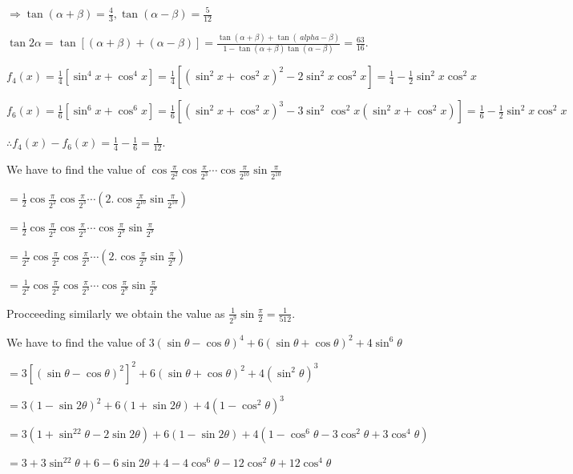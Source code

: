   $\Rightarrow \tan(\alpha + \beta) = \frac{4}{3}, \tan(\alpha - \beta) = \frac{5}{12}$

  $\tan2\alpha = \tan[(\alpha + \beta) + (\alpha - \beta)] = \frac{\tan(\alpha + \beta) + \tan(\
    alpha - \beta)}{1 - \tan(\alpha + \beta)\tan(\alpha - \beta)} = \frac{63}{16}$.
\item $f_4(x) = \frac{1}{4}\left[\sin^4x + \cos^4x\right] = \frac{1}{4}\left[\left(\sin^2x
  + \cos^2x\right)^2 - 2\sin^2x\cos^2x\right] = \frac{1}{4} - \frac{1}{2}\sin^2x\cos^2x$

  $f_6(x) = \frac{1}{6}\left[\sin^6x + \cos^6x\right] = \frac{1}{6}\left[\left(\sin^2x + \cos^2x\right)^3 -
  3\sin^2\cos^2x\left(\sin^2x + \cos^2x\right)\right] = \frac{1}{6} - \frac{1}{2}\sin^2x\cos^2x$

  $\therefore f_4(x) - f_6(x) = \frac{1}{4} - \frac{1}{6} = \frac{1}{12}$.
\item We have to find the value of
  $\cos\frac{\pi}{2^2}\cos\frac{\pi}{2^3}\cdots\cos\frac{\pi}{2^{10}}\sin\frac{\pi}{2^{10}}$

  $= \frac{1}{2}\cos\frac{\pi}{2^2}\cos\frac{\pi}{2^3}\cdots\left(2.\cos\frac{\pi}{2^{10}}\sin\frac{\pi}{2^{10}}\right)$

  $= \frac{1}{2}\cos\frac{\pi}{2^2}\cos\frac{\pi}{2^3}\cdots\cos\frac{\pi}{2^{9}}\sin\frac{\pi}{2^{9}}$

  $= \frac{1}{2^2}\cos\frac{\pi}{2^2}\cos\frac{\pi}{2^3}\cdots\left(2.\cos\frac{\pi}{2^{9}}\sin\frac{\pi}{2^{9}}\right)$

  $= \frac{1}{2^2}\cos\frac{\pi}{2^2}\cos\frac{\pi}{2^3}\cdots\cos\frac{\pi}{2^8}\sin\frac{\pi}{2^8}$

  Procceeding similarly we obtain the value as $\frac{1}{2^9}\sin\frac{\pi}{2} = \frac{1}{512}$.
\item We have to find the value of $3(\sin\theta - \cos\theta)^4 + 6(\sin\theta + \cos\theta)^2 +
  4\sin^6\theta$

  $= 3\left[\left(\sin\theta - \cos\theta\right)^2\right]^2 + 6(\sin\theta + \cos\theta)^2 +
  4\left(\sin^2\theta\right)^3$

  $= 3(1 - \sin2\theta)^2 + 6(1 + \sin2\theta) + 4\left(1 - \cos^2\theta\right)^3$

  $= 3\left(1 + \sin^22\theta - 2\sin2\theta\right) + 6(1 - \sin2\theta) + 4\left(1 - \cos^6\theta -
  3\cos^2\theta + 3\cos^4\theta\right)$

  $= 3 + 3\sin^22\theta + 6 - 6\sin2\theta + 4 - 4\cos^6\theta - 12\cos^2\theta + 12\cos^4\theta$

